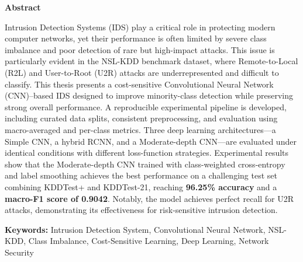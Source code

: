 \thispagestyle{plain}
\begin{center}
    \textbf{\LARGE{Abstract}}
\end{center}
Intrusion Detection Systems (IDS) play a critical role in protecting modern computer networks, yet their performance is often limited by severe class imbalance and poor detection of rare but high-impact attacks. This issue is particularly evident in the NSL-KDD benchmark dataset, where Remote-to-Local (R2L) and User-to-Root (U2R) attacks are underrepresented and difficult to classify. This thesis presents a cost-sensitive Convolutional Neural Network (CNN)–based IDS designed to improve minority-class detection while preserving strong overall performance. A reproducible experimental pipeline is developed, including curated data splits, consistent preprocessing, and evaluation using macro-averaged and per-class metrics. Three deep learning architectures—a Simple CNN, a hybrid RCNN, and a Moderate-depth CNN—are evaluated under identical conditions with different loss-function strategies. Experimental results show that the Moderate-depth CNN trained with class-weighted cross-entropy and label smoothing achieves the best performance on a challenging test set combining KDDTest+ and KDDTest-21, reaching \textbf{96.25\% accuracy} and a \textbf{macro-F1 score of 0.9042}. Notably, the model achieves perfect recall for U2R attacks, demonstrating its effectiveness for risk-sensitive intrusion detection.   

\textbf{Keywords:} Intrusion Detection System, Convolutional Neural Network, NSL-KDD, Class Imbalance, Cost-Sensitive Learning, Deep Learning, Network Security 